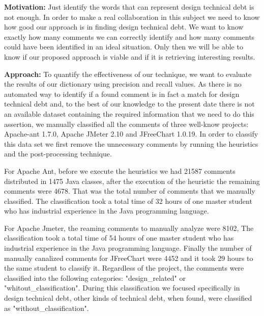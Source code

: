 

\rqii

\noindent \textbf{Motivation:} Just identify the words that can represent design technical debt is not enough. In order to make a real collaboration  in this subject we need to know how good our approach is in finding design technical debt. We want to know exactly how many comments we can correctly identify and how many comments could have been identified in an ideal situation. Only then we will be able to know if our proposed approach is viable and if it is retrieving interesting results.  


\par \noindent \textbf{Approach:} To quantify the effectiveness of our technique, we want to evaluate the results of our dictionary  using precision and recall values. As there is no automated way to identify if a found comment is in fact a match for design technical debt and, to the best of our knowledge to the present date there is not an available dataset containing the required information that we need to do this assertion, we manually classified all the comments of three well-know projects: Apache-ant 1.7.0, Apache JMeter 2.10 and JFreeChart 1.0.19. In order to classify this data set we first remove the unnecessary comments by running the heuristics and the post-processing technique. 

For Apache Ant, before we execute the heuristics we had 21587 comments distributed in 1475 Java classes, after the execution of the heuristic the remaining comments were 4678. That was the total number of comments that we manually classified. The classification took a total time of 32 hours of one master student who has industrial experience in the Java programming language. 

For Apache Jmeter, the reaming  comments to manually analyze were 8102, The classification took a total time of 54 hours of one master student who has industrial experience in the Java programming language. Finally the number of manually canalized comments for JFreeChart  were 4452 and it took 29 hours to the same student to classify it. Regardless of the project, the comments were classified into the following categories: "design\_related" or "whitout\_classification". During this classification we focused specifically in design technical debt, other kinds of technical debt, when found, were classified as "without\_classification". 

